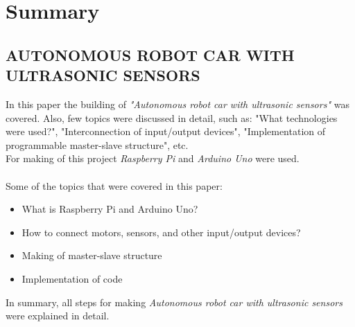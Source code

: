 \section*{Summary}
\subsection*{AUTONOMOUS ROBOT CAR WITH ULTRASONIC SENSORS}
In this paper the building of \textit{"Autonomous robot car with ultrasonic sensors"} was covered.
Also, few topics were discussed in detail, such as: "What technologies were used?", "Interconnection of input/output devices", "Implementation of programmable master-slave structure", etc.\\
\break
For making of this project \textit{Raspberry Pi} and \textit{Arduino Uno} were used.\\\\
Some of the topics that were covered in this paper:
\begin{itemize}
    \item What is Raspberry Pi and Arduino Uno?
    \item How to connect motors, sensors, and other input/output devices?
    \item Making of master-slave structure
    \item Implementation of code
\end{itemize}
In summary, all steps for making \textit{Autonomous robot car with ultrasonic sensors} were explained in detail.
